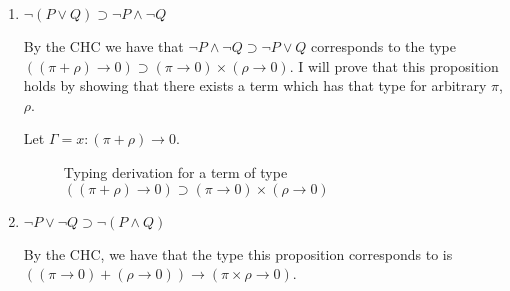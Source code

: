 \documentclass[10pt,\jkfside,a4paper]{article}
\begin{document}
\begin{enumerate}
\begin{enumerate}
\begin{enumerate}
            \item $\neg (P \vee Q) \supset \neg P \land \neg Q$

            By the CHC we have that $\neg P \land \neg Q \supset \neg P \vee Q$ corresponds to the type $((\pi + \rho) \to 0) \supset (\pi \to 0) \times (\rho \to 0)$. I will prove that this proposition
            holds by showing that there exists a term which has that type for arbitrary $\pi$, $\rho$.

            Let $\Gamma = x: (\pi + \rho) \to 0$.

            \begin{sidewaysfigure}

                \centering

                \begin{prooftree}
                \end{prooftree}

                \caption{Typing derivation for a term of type $((\pi + \rho) \to 0) \supset (\pi \to 0) \times (\rho \to 0)$}

            \end{sidewaysfigure}

            \item $\neg P \vee \neg Q \supset \neg (P \land Q)$

            By the CHC, we have that the type this proposition corresponds to is $((\pi \to 0) + (\rho \to 0)) \to (\pi \times \rho \to 0)$.


\end{enumerate}
\end{enumerate}
\end{enumerate}
\end{document}
